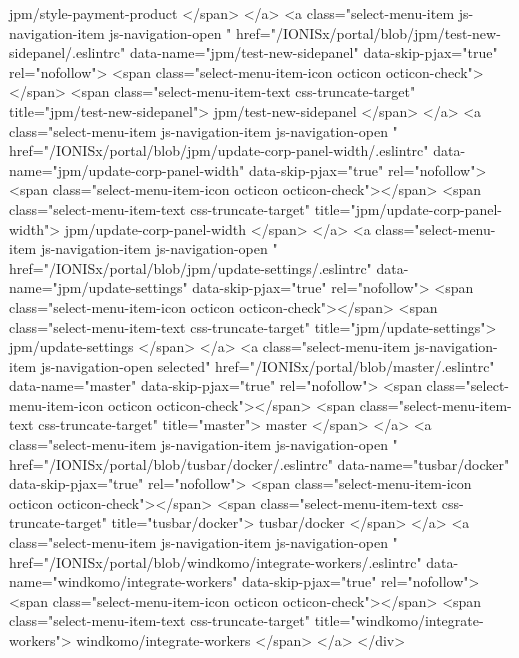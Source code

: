                 jpm/style-payment-product
              </span>
            </a>
            <a class="select-menu-item js-navigation-item js-navigation-open "
               href="/IONISx/portal/blob/jpm/test-new-sidepanel/.eslintrc"
               data-name="jpm/test-new-sidepanel"
               data-skip-pjax="true"
               rel="nofollow">
              <span class="select-menu-item-icon octicon octicon-check"></span>
              <span class="select-menu-item-text css-truncate-target" title="jpm/test-new-sidepanel">
                jpm/test-new-sidepanel
              </span>
            </a>
            <a class="select-menu-item js-navigation-item js-navigation-open "
               href="/IONISx/portal/blob/jpm/update-corp-panel-width/.eslintrc"
               data-name="jpm/update-corp-panel-width"
               data-skip-pjax="true"
               rel="nofollow">
              <span class="select-menu-item-icon octicon octicon-check"></span>
              <span class="select-menu-item-text css-truncate-target" title="jpm/update-corp-panel-width">
                jpm/update-corp-panel-width
              </span>
            </a>
            <a class="select-menu-item js-navigation-item js-navigation-open "
               href="/IONISx/portal/blob/jpm/update-settings/.eslintrc"
               data-name="jpm/update-settings"
               data-skip-pjax="true"
               rel="nofollow">
              <span class="select-menu-item-icon octicon octicon-check"></span>
              <span class="select-menu-item-text css-truncate-target" title="jpm/update-settings">
                jpm/update-settings
              </span>
            </a>
            <a class="select-menu-item js-navigation-item js-navigation-open selected"
               href="/IONISx/portal/blob/master/.eslintrc"
               data-name="master"
               data-skip-pjax="true"
               rel="nofollow">
              <span class="select-menu-item-icon octicon octicon-check"></span>
              <span class="select-menu-item-text css-truncate-target" title="master">
                master
              </span>
            </a>
            <a class="select-menu-item js-navigation-item js-navigation-open "
               href="/IONISx/portal/blob/tusbar/docker/.eslintrc"
               data-name="tusbar/docker"
               data-skip-pjax="true"
               rel="nofollow">
              <span class="select-menu-item-icon octicon octicon-check"></span>
              <span class="select-menu-item-text css-truncate-target" title="tusbar/docker">
                tusbar/docker
              </span>
            </a>
            <a class="select-menu-item js-navigation-item js-navigation-open "
               href="/IONISx/portal/blob/windkomo/integrate-workers/.eslintrc"
               data-name="windkomo/integrate-workers"
               data-skip-pjax="true"
               rel="nofollow">
              <span class="select-menu-item-icon octicon octicon-check"></span>
              <span class="select-menu-item-text css-truncate-target" title="windkomo/integrate-workers">
                windkomo/integrate-workers
              </span>
            </a>
        </div>

